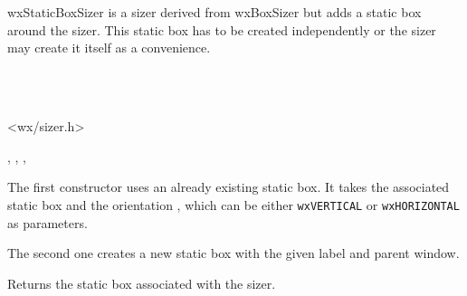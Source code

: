 \section{}\label{wxstaticboxsizer}

wxStaticBoxSizer is a sizer derived from wxBoxSizer but adds a static
box around the sizer. This static box has to be created independently or the
sizer may create it itself as a convenience.


\\
\\


<wx/sizer.h>


, , , 



\label{wxstaticboxsizerwxstaticboxsizer}



The first constructor uses an already existing static box. It takes the
associated static box and the orientation , which can be either
\texttt{wxVERTICAL} or \texttt{wxHORIZONTAL} as parameters.

The second one creates a new static box with the given label and parent window.


\label{wxstaticboxsizergetstaticbox}


Returns the static box associated with the sizer.

